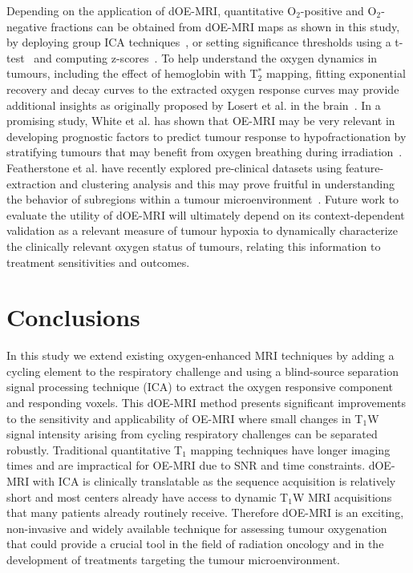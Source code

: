 Depending on the application of dOE-MRI, quantitative O$_2$-positive and O$_2$-negative fractions can be obtained from dOE-MRI maps as shown in this study, by deploying group ICA techniques~\cite{Calhoun:2009jr}, or setting significance thresholds using a t-test~\cite{Greicius:2004ck} and computing z-scores~\cite{McKeown:1998wd}.
To help understand the oxygen dynamics in tumours, including the effect of hemoglobin with T$_2^*$ mapping, fitting exponential recovery and decay curves to the extracted oxygen response curves may provide additional insights as originally proposed by Losert et al. in the brain~\cite{Losert:2002gt}.
In a promising study, White et al. has shown that OE-MRI may be very relevant in developing prognostic factors to predict tumour response to hypofractionation by stratifying tumours that may benefit from oxygen breathing during irradiation~\cite{White:2016fz}.
Featherstone et al. have recently explored pre-clinical datasets using feature-extraction and clustering analysis and this may prove fruitful in understanding the behavior of subregions within a tumour microenvironment~\cite{Featherstone:2018cn}.
Future work to evaluate the utility of dOE-MRI will ultimately depend on its context-dependent validation as a relevant measure of tumour hypoxia to dynamically characterize the clinically relevant oxygen status of tumours, relating this information to treatment sensitivities and outcomes.

\section{Conclusions}
In this study we extend existing oxygen-enhanced MRI techniques by adding a cycling element to the respiratory challenge and using a blind-source separation signal processing technique (ICA) to extract the oxygen responsive component and responding voxels.
This dOE-MRI method presents significant improvements to the sensitivity and applicability of OE-MRI where small changes in T$_1$W signal intensity arising from cycling respiratory challenges can be separated robustly. Traditional quantitative T$_1$ mapping techniques have longer imaging times and are impractical for OE-MRI due to SNR and time constraints.
dOE-MRI with ICA is clinically translatable as the sequence acquisition is relatively short and most centers already have access to dynamic T$_1$W MRI acquisitions that many patients already routinely receive. 
Therefore dOE-MRI is an exciting, non-invasive and widely available technique for assessing tumour oxygenation that could provide a crucial tool in the field of radiation oncology and in the development of treatments targeting the tumour microenvironment.


